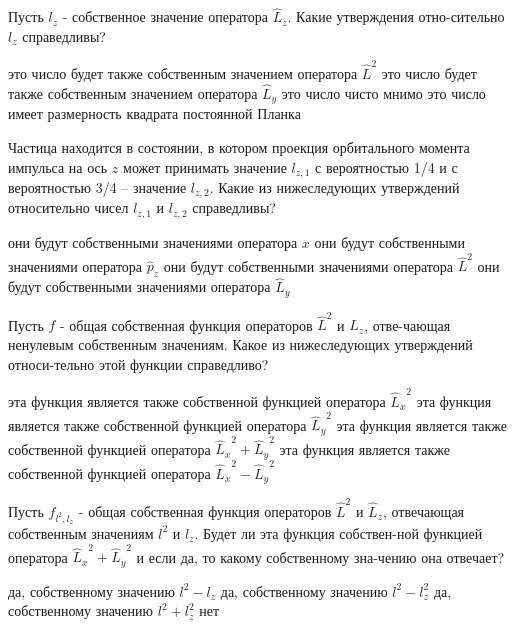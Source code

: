 \documentclass[11pt,a4paper]{exam}
\begin{document}
\begin{questions}
\question Пусть ${l_z}$ - собственное значение оператора ${\hat L_z}$. Какие утверждения отно-сительно ${l_z}$ справедливы?
\begin{choices}
\choice это число будет также собственным значением оператора ${\hat L^2}$
\choice это число будет также собственным значением оператора ${\hat L_y}$
\choice это число чисто мнимо
\choice это число имеет размерность квадрата постоянной Планка
\end{choices}

\question Частица находится в состоянии, в котором проекция орбитального момента импульса на ось $z$ может принимать значение ${l_{z,1}}$ с вероятностью 1/4 и с вероятностью 3/4 – значение ${l_{z,2}}$. Какие из нижеследующих утверждений относительно чисел ${l_{z,1}}$ и ${l_{z,2}}$ справедливы?
\begin{choices}
\choice они будут собственными значениями оператора $x$
\choice они будут собственными значениями оператора ${\hat p_z}$
\choice они будут собственными значениями оператора ${\hat L^2}$
\choice они будут собственными значениями оператора ${\hat L_y}$
\end{choices}

\question Пусть $f$ - общая собственная функция операторов ${\hat L^2}$ и ${\hat L_z}$, отве-чающая ненулевым собственным значениям. Какое из нижеследующих утверждений относи-тельно этой функции справедливо?
\begin{choices}
\choice эта функция является также собственной функцией оператора ${\hat L_x}^2$
\choice эта функция является также собственной функцией оператора ${\hat L_y}^2$
\choice эта функция является также собственной функцией оператора ${\hat L_x}^2 + {\hat L_y}^2$
\choice эта функция является также собственной функцией оператора ${\hat L_x}^2 - {\hat L_y}^2$
\end{choices}

\question Пусть ${f_{{l^2},{l_z}}}$ - общая собственная функция операторов ${\hat L^2}$ и ${\hat L_z}$, отвечающая собственным значениям ${l^2}$ и ${l_z}$. Будет ли эта функция собствен-ной функцией оператора ${\hat L_x}^2 + {\hat L_y}^2$ и если да, то какому собственному зна-чению она отвечает?
\begin{choices}
\choice да, собственному значению ${l^2} - {l_z}$
\choice да, собственному значению ${l^2} - l_z^2$
\choice да, собственному значению ${l^2} + l_z^2$
\choice нет
\end{choices}


\end{questions}
\end{document}
